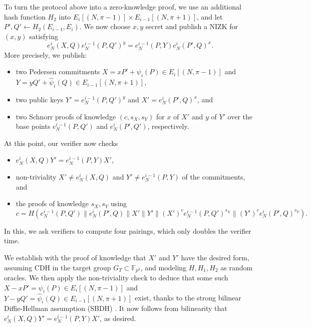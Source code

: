\documentclass{llncs}
\newcommand{\F}{\mathbb{F}}
\begin{document}
To turn the protocol above into a zero-knowledge proof, we use an
additional hash function $H_2$ into
$E_i[(N,\pi-1)]\times E_{i-1}[(N,\pi+1)]$, and let
$P',Q' \gets H_2(E_{i-1},E_i)$. %
We now choose $x,y$ secret and publish a NIZK for $(x,y)$ satisfying
$$ e_N^i(X,Q) e_N^{i-1}(P,Q')^y  = e_N^{i-1}(P,Y) e_N^i(P',Q)^x . $$
More precisely, we publish:
\begin{itemize}
\item two Pedersen commitments 
 $X = x P' + \psi_i(P) \in E_i[(N,\pi-1)]$ and
 $Y = y Q' + \hat\psi_i(Q) \in E_{i-1}[(N,\pi+1)]$,
\item two public keys $Y' = e_N^{i-1}(P,Q')^y$ and $X' = e_N^i(P',Q)^x$, and
\item two Schnorr proofs of knowledge $(c,s_X,s_Y)$ for $x$ of $X'$ and $y$ of $Y'$
over the base points $e_N^{i-1}(P,Q')$ and $e_N^i(P',Q')$, respectively.
\end{itemize}
At this point, our verifier now checks 
\begin{itemize}
\item $e_N^i(X,Q) Y' = e_N^{i-1}(P,Y) X'$,
\item non-triviality $X' \ne e_N^i(X,Q)$ and $Y' \ne e_N^{i-1}(P,Y)$ of the commitments, and
\item the proofs of knowledge $s_X,s_Y$ using
$$ c = H( 
  e_N^{i-1}(P,Q') \| e_N^i(P',Q) \| 
  X' \| Y' \| 
  (X')^c e_N^{i-1}(P,Q')^{s_X} \| 
  (Y')^c e_N^i(P',Q)^{s_Y} 
). $$
\end{itemize}
In this, we ask verifiers to compute four pairings, which only doubles
the verifier time.

We establish with the proof of knowledge that $X'$ and $Y'$ have
the desired form, assuming CDH in the target group $G_T\subset\F_{p^2}$,
and modeling $H,H_1,H_2$ as random oracles.
We then apply the non-triviality check to deduce that some such 
 $X - x P' = \psi_i(P) \in E_i[(N,\pi-1)]$ and
 $Y - y Q' = \hat\psi_i(Q) \in E_{i-1}[(N,\pi+1)]$
exist, thanks to the strong bilinear Diffie-Hellman assumption (SBDH) 
\cite{10.1007/978-3-540-74143-5_24}. 
It now follows from bilinearity that $e_N^i(X,Q)Y' = e_N^{i-1}(P,Y)X'$, as desired.
\end{document}
